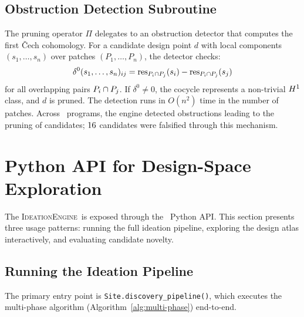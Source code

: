 \documentclass[11pt]{article}
\newcommand{\IdeationEngine}{\textsc{IdeationEngine}}
\begin{document}
\subsection{Obstruction Detection Subroutine}

The pruning operator $\Pi$ delegates to an obstruction detector
that computes the first \v{C}ech cohomology.  For a candidate
design point $d$ with local components $(s_1, \ldots, s_n)$
over patches $(P_1, \ldots, P_n)$, the detector checks:
\[
  \delta^0(s_1, \ldots, s_n)_{ij} =
  \mathrm{res}_{P_i \cap P_j}(s_i) - \mathrm{res}_{P_i \cap P_j}(s_j)
\]
for all overlapping pairs $P_i \cap P_j$.  If $\delta^0 \neq 0$,
the cocycle represents a non-trivial $H^{1}$ class, and $d$ is
pruned.  The detection runs in $O(n^2)$ time in the number of patches.
Across \ppLIItotalPrograms\ programs, the engine detected obstructions
leading to the pruning of candidates; $16$
candidates were falsified through this mechanism.

\section{Python API for Design-Space Exploration}\label{sec:api}

The \IdeationEngine\ is exposed through the \JuGeo\ Python API.
This section presents three usage patterns: running the full ideation
pipeline, exploring the design atlas interactively, and evaluating
candidate novelty.

\subsection{Running the Ideation Pipeline}

The primary entry point is \texttt{Site.discovery\_pipeline()}, which
executes the multi-phase algorithm (Algorithm~\ref{alg:multi-phase})
end-to-end.
\end{document}
